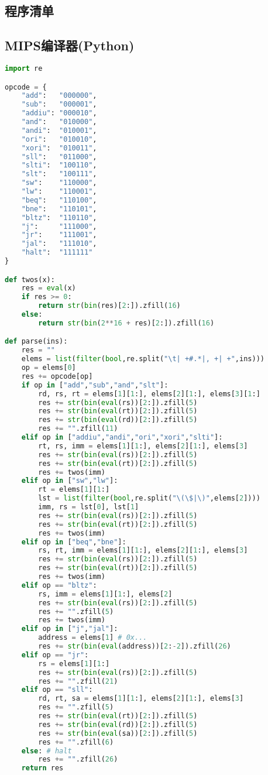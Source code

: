 
\newpage
\begin{multicols}{2}
\section{程序清单}
\label{sec:appendix}
\subsection{MIPS编译器(Python)}
\begin{lstlisting}[language=python]
import re

opcode = {
	"add":   "000000",
	"sub":   "000001",
	"addiu": "000010",
	"and":   "010000",
	"andi":  "010001",
	"ori":   "010010",
	"xori":  "010011",
	"sll":   "011000",
	"slti":  "100110",
	"slt":   "100111",
	"sw":    "110000",
	"lw":    "110001",
	"beq":   "110100",
	"bne":   "110101",
	"bltz":  "110110",
	"j":     "111000",
	"jr":    "111001",
	"jal":   "111010",
	"halt":  "111111"
}

def twos(x):
	res = eval(x)
	if res >= 0:
		return str(bin(res)[2:]).zfill(16)
	else:
		return str(bin(2**16 + res)[2:]).zfill(16)

def parse(ins):
	res = ""
	elems = list(filter(bool,re.split("\t| +#.*|, +| +",ins)))
	op = elems[0]
	res += opcode[op]
	if op in ["add","sub","and","slt"]:
		rd, rs, rt = elems[1][1:], elems[2][1:], elems[3][1:]
		res += str(bin(eval(rs))[2:]).zfill(5)
		res += str(bin(eval(rt))[2:]).zfill(5)
		res += str(bin(eval(rd))[2:]).zfill(5)
		res += "".zfill(11)
	elif op in ["addiu","andi","ori","xori","slti"]:
		rt, rs, imm = elems[1][1:], elems[2][1:], elems[3]
		res += str(bin(eval(rs))[2:]).zfill(5)
		res += str(bin(eval(rt))[2:]).zfill(5)
		res += twos(imm)
	elif op in ["sw","lw"]:
		rt = elems[1][1:]
		lst = list(filter(bool,re.split("\(\$|\)",elems[2])))
		imm, rs = lst[0], lst[1]
		res += str(bin(eval(rs))[2:]).zfill(5)
		res += str(bin(eval(rt))[2:]).zfill(5)
		res += twos(imm)
	elif op in ["beq","bne"]:
		rs, rt, imm = elems[1][1:], elems[2][1:], elems[3]
		res += str(bin(eval(rs))[2:]).zfill(5)
		res += str(bin(eval(rt))[2:]).zfill(5)
		res += twos(imm)
	elif op == "bltz":
		rs, imm = elems[1][1:], elems[2]
		res += str(bin(eval(rs))[2:]).zfill(5)
		res += "".zfill(5)
		res += twos(imm)
	elif op in ["j","jal"]:
		address = elems[1] # 0x...
		res += str(bin(eval(address))[2:-2]).zfill(26)
	elif op == "jr":
		rs = elems[1][1:]
		res += str(bin(eval(rs))[2:]).zfill(5)
		res += "".zfill(21)
	elif op == "sll":
		rd, rt, sa = elems[1][1:], elems[2][1:], elems[3]
		res += "".zfill(5)
		res += str(bin(eval(rt))[2:]).zfill(5)
		res += str(bin(eval(rd))[2:]).zfill(5)
		res += str(bin(eval(sa))[2:]).zfill(5)
		res += "".zfill(6)
	else: # halt
		res += "".zfill(26)
	return res


\end{lstlisting}
\end{multicols}
